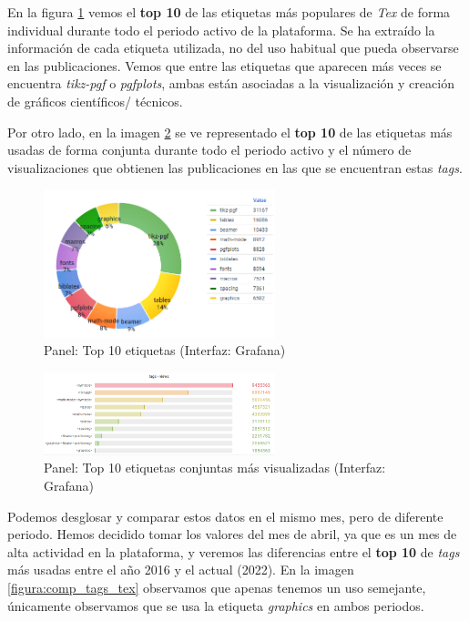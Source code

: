 \documentclass[a4paper, 12pt]{book}
\begin{document}
En la figura \ref{figura:top10_tags_tex} vemos el \textbf{top 10} de las etiquetas más populares de \emph{Tex} de forma individual durante todo el periodo activo de la plataforma. Se ha extraído la información de cada etiqueta utilizada, no del uso habitual que pueda observarse en las publicaciones. Vemos que entre las etiquetas que aparecen más veces se encuentra \emph{tikz-pgf} o \emph{pgfplots}, ambas están asociadas a la visualización y creación de gráficos científicos/ técnicos. 

Por otro lado, en la imagen \ref{figura:evo_tags_tex} se ve representado el \textbf{top 10} de las etiquetas más usadas de forma conjunta durante todo el periodo activo y el número de visualizaciones que obtienen las publicaciones en las que se encuentran estas \emph{tags}. 

\begin{figure}[ht]
    \centering
    \includegraphics[width=0.6\textwidth]{img/tex/tags_evo_tex.png}
    \caption{Panel: Top 10 etiquetas (Interfaz: Grafana)}
    \label{figura:top10_tags_tex}
\end{figure}

\begin{figure}[ht]
    \centering
    \includegraphics[width=0.6\textwidth]{img/tex/evo_tags_tex.png}
    \caption{Panel: Top 10 etiquetas conjuntas más visualizadas (Interfaz: Grafana)}
    \label{figura:evo_tags_tex}
\end{figure}

Podemos desglosar y comparar estos datos en el mismo mes, pero de diferente periodo. Hemos decidido tomar los valores del mes de abril, ya que es un mes de alta actividad en la plataforma, y veremos las diferencias entre el \textbf{top 10} de \emph{tags} más usadas entre el año 2016 y el actual (2022). En la imagen \ref{figura:comp_tags_tex} observamos que apenas tenemos un uso semejante, únicamente observamos que se usa la etiqueta \emph{graphics} en ambos periodos.
\end{document}
